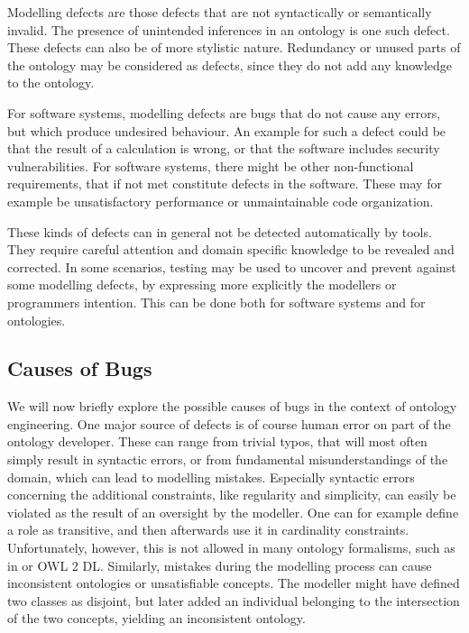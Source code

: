 Modelling defects are those defects that are not syntactically or semantically invalid. The presence of unintended inferences in an ontology is one such defect. These defects can also be of more stylistic nature. Redundancy or unused parts of the ontology may be considered as defects, since they do not add any knowledge to the ontology.

For software systems, modelling defects are bugs that do not cause any errors, but which produce undesired behaviour. An example for such a defect could be that the result of a calculation is wrong, or that the software includes security vulnerabilities. For software systems, there might be other non-functional requirements, that if not met constitute defects in the software. These may for example be unsatisfactory performance or unmaintainable code organization.

These kinds of defects can in general not be detected automatically by tools. They require careful attention and domain specific knowledge to be revealed and corrected. In some scenarios, testing may be used to uncover and prevent against some modelling defects, by expressing more explicitly the modellers or programmers intention. This can be done both for software systems and for ontologies.

\subsection{Causes of Bugs} \label{causes-of-bugs}

We will now briefly explore the possible causes of bugs in the context of ontology engineering. One major source of defects is of course human error on part of the ontology developer. These can range from trivial typos, that will most often simply result in syntactic errors, or from fundamental misunderstandings of the domain, which can lead to modelling mistakes. Especially syntactic errors concerning the additional constraints, like regularity and simplicity, can easily be violated as the result of an oversight by the modeller. One can for example define a role as transitive, and then afterwards use it in cardinality constraints. Unfortunately, however, this is not allowed in many ontology formalisms, such as in \SROIQ or OWL 2 DL. Similarly, mistakes during the modelling process can cause inconsistent ontologies or unsatisfiable concepts. The modeller might have defined two classes as disjoint, but later added an individual belonging to the intersection of the two concepts, yielding an inconsistent ontology.


